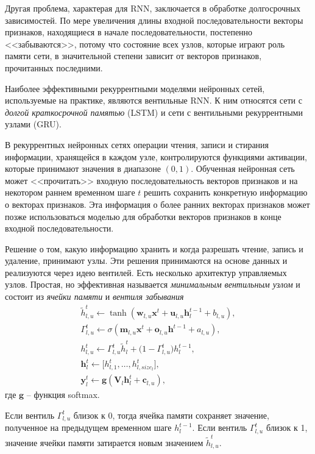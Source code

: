 \documentclass[%
	11pt,
	a4paper,
	utf8,
		]{article}
\begin{document}
Другая проблема, характерая для RNN, заключается в обработке долгосрочных зависимостей. По мере увеличения длины входной последовательности векторы признаков, находящиеся в начале последовательности, постепенно <<забываются>>, потому что состояние всех узлов, которые играют роль памяти сети, в значительной степени зависит от векторов признаков, прочитанных последними.

Наиболее эффективными рекуррентными моделями нейронных сетей, используемые на практике, являются вентильные RNN. К ним относятся сети с \emph{долгой краткосрочной памятью} (LSTM) и сети с вентильными рекуррентными узлами (GRU).

В рекуррентных нейронных сетях операции чтения, записи и стирания информации, хранящейся в каждом узле, контролируются функциями активации, которые принимают значения в диапазоне $ (0, 1) $. Обученная нейронная сеть может <<прочитать>> входную последовательность векторов признаков и на некотором раннем временном шаге $ t $ решить сохранить конкретную информацию о векторах признаков. Эта информация о более ранних векторах признаков может позже использоваться моделью для обработки векторов признаков в конце входной последовательности.

Решение о том, какую информацию хранить и когда разрешать чтение, запись и удаление, принимают узлы. Эти решения принимаются на основе данных и реализуются через идею вентилей. Есть несколько архитектур управляемых узлов. Простая, но эффективная называется \emph{минимальным вентильным узлом} и состоит из \emph{ячейки памяти} и \emph{вентиля забывания}
\begin{align*}
	\tilde{h}^t_{l,u} \leftarrow \tanh (\mathbf{w}_{l,u} \mathbf{x}^t + \mathbf{u}_{l,u} \mathbf{h}_l^{t-1} + b_{l,u}),\\
	\Gamma_{l,u}^t \leftarrow \sigma (\mathbf{m}_{l,u} \mathbf{x}^t + \mathbf{o}_{l,u} \mathbf{h}^{t - 1} + a_{l, u}),\\
	h^t_{l,u} \leftarrow \Gamma^t_{l,u} \tilde{h}_l^t + \big( 1 - \Gamma^t_{l,u}  \big) h_l^{t - 1},\\
	\mathbf{h}_l^t \leftarrow \big[ h_{l,1}^t, \ldots, h_{l, size_l}^t \big],\\
	\mathbf{y}_l^t \leftarrow \mathbf{g}(\mathbf{V}_l \mathbf{h}_l^t + \mathbf{c}_{l,u}),
\end{align*}
где $ \mathbf{g} $ -- функция softmax.

Если вентиль $ \Gamma_{l,u}^t $ близок к 0, тогда ячейка памяти сохраняет значение, полученное на предыдущем временном шаге $ h_l^{t-1} $. Если вентиль $ \Gamma_{l,u}^t $ близок к 1, значение ячейки памяти затирается новым значением $ \tilde{h}^t_{l,u} $.
\end{document}
